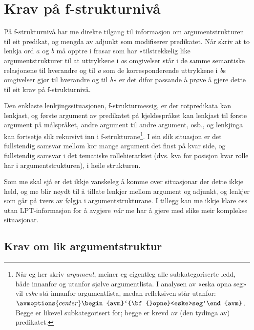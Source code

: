 \documentclass[12pt,a4paper,oneside,draft]{report}
\begin{document}
\section{Krav på f-strukturnivå}
\label{sec-3.6}

 
På f-strukturnivå har me direkte tilgang til informasjon om
argumentstrukturen til eit predikat, og mengda av adjunkt som
modifiserer predikatet. Når \citet[s.~3]{thunes2003eal} skriv at to
lenkja ord $a$ og $b$ må opptre i frasar som har «tilstrekkelig like
argumentstrukturer til at uttrykkene i \emph{a}s omgivelser står i de
samme semantiske relasjonene til hverandre og til \emph{a} som de
korresponderende uttrykkene i \emph{b}s omgivelser gjør til hverandre
og til \emph{b}» er det difor passande å prøve å gjere dette til eit
krav på f-strukturnivå.

Den enklaste lenkjingssituasjonen, f-strukturmessig, er der
rotpredikata kan lenkjast, og første argument av predikatet på
kjeldespråket kan lenkjast til første argument på målspråket, andre
argument til andre argument, osb., og lenkjinga kan fortsetje slik
rekursivt inn i f-strukturane\footnote{Når eg her skriv \emph{argument}, meiner eg eigentleg alle
        subkategoriserte ledd, både innanfor og utanfor sjølve
        argumentlista. I analysen av «eska opna seg» vil \emph{eske} stå
        innanfor argumentlista, medan refleksiven står utanfor:
        ${\avmoptions{center}\begin{avm}`{\bf{}opne}<eske>seg'\end{avm}}$.
        Begge er likevel subkategorisert for; begge er krevd av (den
        tydinga av) predikatet. }. I ein slik situasjon er det fullstendig
samsvar mellom kor mange argument det finst på kvar side, og
fullstendig samsvar i det tematiske rollehierarkiet (dvs. kva for
posisjon kvar rolle har i argumentstrukturen), i heile strukturen.

Som me skal sjå er det ikkje vanskeleg å komme over situasjonar der
dette ikkje held, og me blir nøydt til å tillate lenkjer mellom
argument og adjunkt, og lenkjer som går på tvers av følgja i
argumentstrukturane. I tillegg kan me ikkje klare oss utan
LPT-informasjon for å avgjere \emph{når} me har å gjere med slike meir
komplekse situasjonar. 
\subsection{Krav om lik argumentstruktur}
\label{sec-3.6.1}

\label{SEC:lik-argstr}
\end{document}
